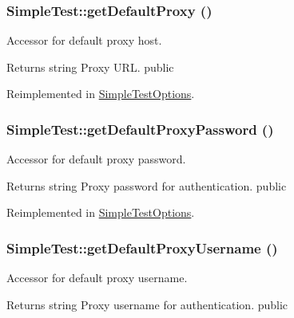 \hypertarget{class_simple_test_ad365479a7b328142767560e440f1f2c0}{
\subsubsection[{getDefaultProxy}]{\setlength{\rightskip}{0pt plus 5cm}SimpleTest::getDefaultProxy ()}}
\label{class_simple_test_ad365479a7b328142767560e440f1f2c0}
Accessor for default proxy host. \begin{DoxyReturn}{Returns}
string Proxy URL.  public 
\end{DoxyReturn}


Reimplemented in \hyperlink{class_simple_test_options_abc355e97139c010dce4d0fbe181a1cfe}{SimpleTestOptions}.\hypertarget{class_simple_test_a2624d0e6c9d79700b03600fca215e642}{
\subsubsection[{getDefaultProxyPassword}]{\setlength{\rightskip}{0pt plus 5cm}SimpleTest::getDefaultProxyPassword ()}}
\label{class_simple_test_a2624d0e6c9d79700b03600fca215e642}
Accessor for default proxy password. \begin{DoxyReturn}{Returns}
string Proxy password for authentication.  public 
\end{DoxyReturn}


Reimplemented in \hyperlink{class_simple_test_options_ac0c29d1f79a425dc7053d9269b63f1f6}{SimpleTestOptions}.\hypertarget{class_simple_test_aabcb9a6457417c17e297d95ca9a1a1db}{
\subsubsection[{getDefaultProxyUsername}]{\setlength{\rightskip}{0pt plus 5cm}SimpleTest::getDefaultProxyUsername ()}}
\label{class_simple_test_aabcb9a6457417c17e297d95ca9a1a1db}
Accessor for default proxy username. \begin{DoxyReturn}{Returns}
string Proxy username for authentication.  public 
\end{DoxyReturn}


